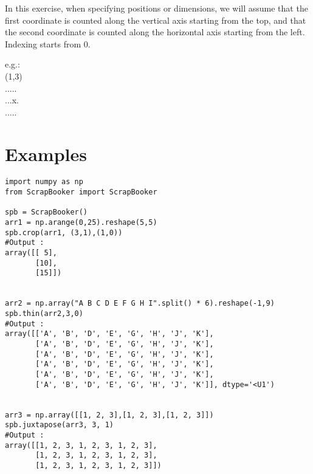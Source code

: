 \newline
In this exercise, when specifying positions or dimensions, we will assume
that the first coordinate is counted along the vertical axis starting from
the top, and that the second coordinate is counted along the horizontal axis
starting from the left. Indexing starts from 0.\\

\parbox{\textwidth}{
  e.g.:\\
  (1,3)\\
  .....\\
  ...x.\\
  .....}


\section*{Examples}
\begin{verbatim}
import numpy as np
from ScrapBooker import ScrapBooker

spb = ScrapBooker()
arr1 = np.arange(0,25).reshape(5,5)
spb.crop(arr1, (3,1),(1,0))
#Output :
array([[ 5],
       [10],
       [15]])


arr2 = np.array("A B C D E F G H I".split() * 6).reshape(-1,9)
spb.thin(arr2,3,0)
#Output :
array([['A', 'B', 'D', 'E', 'G', 'H', 'J', 'K'],
       ['A', 'B', 'D', 'E', 'G', 'H', 'J', 'K'],
       ['A', 'B', 'D', 'E', 'G', 'H', 'J', 'K'],
       ['A', 'B', 'D', 'E', 'G', 'H', 'J', 'K'],
       ['A', 'B', 'D', 'E', 'G', 'H', 'J', 'K'],
       ['A', 'B', 'D', 'E', 'G', 'H', 'J', 'K']], dtype='<U1')


arr3 = np.array([[1, 2, 3],[1, 2, 3],[1, 2, 3]])
spb.juxtapose(arr3, 3, 1)
#Output :
array([[1, 2, 3, 1, 2, 3, 1, 2, 3],
       [1, 2, 3, 1, 2, 3, 1, 2, 3],
       [1, 2, 3, 1, 2, 3, 1, 2, 3]])
\end{verbatim}
